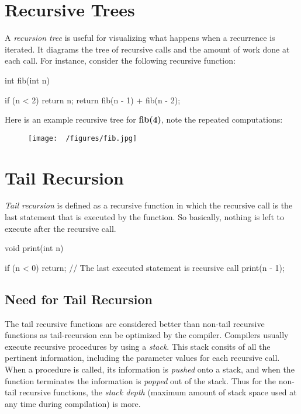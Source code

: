 \documentclass{report}
\begin{document}
\section{Recursive Trees}
A \textit{recursion tree} is useful for visualizing what happens when a recurrence is iterated. It diagrams the tree of recursive calls and the amount of work done at each call.
\bigbreak \noindent
For instance, consider the following recursive function:
\begin{cppcode}

  int fib(int n) {

    if (n < 2)
      return n;
    return fib(n - 1) + fib(n - 2);
  }

\end{cppcode}
\bigbreak \noindent 
Here is an example recursive tree for \textbf{fib(4)}, note the repeated computations:

\begin{figure}[H]
\centering
\texttt{[image:  ~/figures/fib.jpg]}
\end{figure}

\section{Tail Recursion}
\textit{Tail recursion} is defined as a recursive function in which the recursive call is the last statement that is executed by the function. So basically, nothing is left to execute after the recursive call.
\bigbreak \noindent
\begin{cppcode}

  void print(int n) {

    if (n < 0) {
      return;
    }
    // The last executed statement is recursive call
    print(n - 1);
}
\end{cppcode}
\subsection{Need for Tail Recursion}
The tail recursive functions are considered better than non-tail recursive functions as tail-recursion can be optimized by the compiler.
\bigbreak \noindent
Compilers usually execute recursive procedures by using a \textit{stack}. This stack consits of all the pertinent information, including the parameter values for each recursive call.
\bigbreak \noindent
When a procedure is called, its information is \textit{pushed} onto a stack, and when the function terminates the information is \textit{popped} out of the stack. Thus for the non-tail recursive functions, the \textit{stack depth} (maximum amount of stack space used at any time during compilation) is more.
\end{document}
